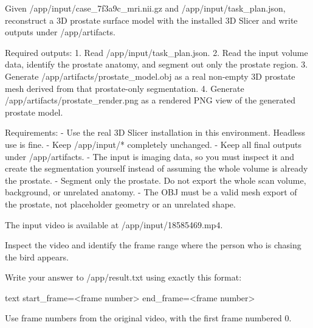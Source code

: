 \documentclass{llmxive}
\begin{document}
\begin{instructionbox}
Given \textasciigrave{}/app/input/case\_7f3a9c\_mri.nii.gz\textasciigrave{} and \textasciigrave{}/app/input/task\_plan.json\textasciigrave{}, reconstruct a 3D prostate surface model with the installed 3D Slicer and write outputs under \textasciigrave{}/app/artifacts\textasciigrave{}.

Required outputs:
1. Read \textasciigrave{}/app/input/task\_plan.json\textasciigrave{}.
2. Read the input volume data, identify the prostate anatomy, and segment out only the prostate region.
3. Generate \textasciigrave{}/app/artifacts/prostate\_model.obj\textasciigrave{} as a real non-empty 3D prostate mesh derived from that prostate-only segmentation.
4. Generate \textasciigrave{}/app/artifacts/prostate\_render.png\textasciigrave{} as a rendered PNG view of the generated prostate model.

Requirements:
- Use the real 3D Slicer installation in this environment. Headless use is fine.
- Keep \textasciigrave{}/app/input/*\textasciigrave{} completely unchanged.
- Keep all final outputs under \textasciigrave{}/app/artifacts\textasciigrave{}.
- The input is imaging data, so you must inspect it and create the segmentation yourself instead of assuming the whole volume is already the prostate.
- Segment only the prostate. Do not export the whole scan volume, background, or unrelated anatomy.
- The OBJ must be a valid mesh export of the prostate, not placeholder geometry or an unrelated shape.
\end{instructionbox}

\begin{instructionbox}
The input video is available at \textasciigrave{}/app/input/18585469.mp4\textasciigrave{}.

Inspect the video and identify the frame range where the person who is chasing the bird appears.

Write your answer to \textasciigrave{}/app/result.txt\textasciigrave{} using exactly this format:

\textasciigrave{}\textasciigrave{}\textasciigrave{}text
start\_frame=\textless{}frame number\textgreater{}
end\_frame=\textless{}frame number\textgreater{}
\textasciigrave{}\textasciigrave{}\textasciigrave{}

Use frame numbers from the original video, with the first frame numbered \textasciigrave{}0\textasciigrave{}.
\end{instructionbox}
\end{document}
